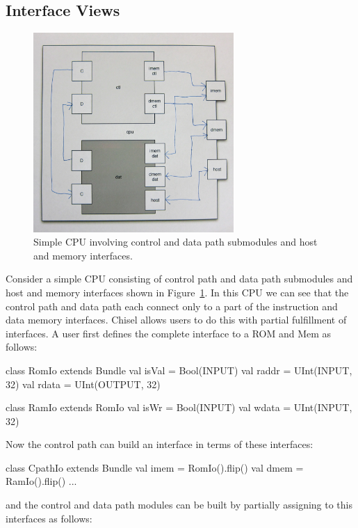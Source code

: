 \documentclass[twocolumn,10pt]{article}
\begin{document}
\subsection{Interface Views}

\begin{figure}
\centerline{\includegraphics[width=3in]{figs/cpu.png}}
\caption{Simple CPU involving control and data path submodules and host and memory interfaces.}
\label{fig:cpu}
\end{figure}

Consider a simple CPU consisting of control path and data path submodules and host and memory interfaces shown in Figure~\ref{fig:cpu}.
In this CPU we can see that the control path and data path each connect only to a part of the instruction and data memory interfaces. 
Chisel allows users to do this with partial fulfillment of interfaces.
A user first defines the complete interface to a ROM and Mem as follows:

\begin{scala}
class RomIo extends Bundle {
  val isVal = Bool(INPUT)
  val raddr = UInt(INPUT, 32)
  val rdata = UInt(OUTPUT, 32)
}

class RamIo extends RomIo {
  val isWr  = Bool(INPUT)
  val wdata = UInt(INPUT, 32)
}
\end{scala}

\noindent
Now the control path can build an interface in terms of these interfaces:

\begin{scala}
class CpathIo extends Bundle {
  val imem = RomIo().flip()
  val dmem = RamIo().flip()
  ...
}
\end{scala}

\noindent
and the control and data path modules can be built by partially assigning to
this interfaces as follows:
\end{document}
